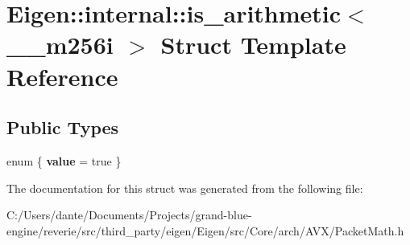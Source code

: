 \hypertarget{struct_eigen_1_1internal_1_1is__arithmetic_3_01____m256i_01_4}{}\section{Eigen\+::internal\+::is\+\_\+arithmetic$<$ \+\_\+\+\_\+m256i $>$ Struct Template Reference}
\label{struct_eigen_1_1internal_1_1is__arithmetic_3_01____m256i_01_4}
\subsection*{Public Types}
\begin{DoxyCompactItemize}
\item 
\mbox{\label{struct_eigen_1_1internal_1_1is__arithmetic_3_01____m256i_01_4_af6d4980da22e833546e783ae9b275a5b}} 
enum \{ {\bfseries value} = true
 \}
\end{DoxyCompactItemize}


The documentation for this struct was generated from the following file\+:\begin{DoxyCompactItemize}
\item 
C\+:/\+Users/dante/\+Documents/\+Projects/grand-\/blue-\/engine/reverie/src/third\+\_\+party/eigen/\+Eigen/src/\+Core/arch/\+A\+V\+X/Packet\+Math.\+h\end{DoxyCompactItemize}
